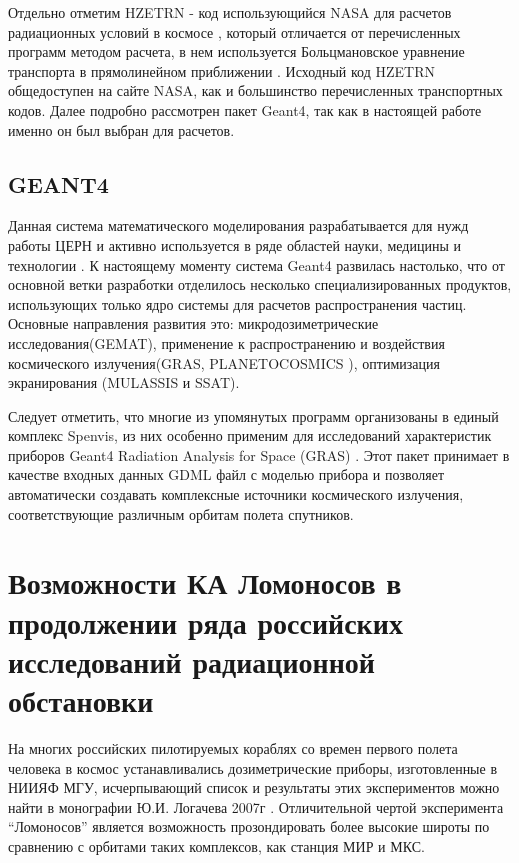 Отдельно отметим HZETRN - код использующийся NASA для расчетов радиационных условий в космосе \cite{Heinbockel2009}, который отличается от перечисленных программ методом расчета, в нем используется Больцмановское уравнение транспорта в прямолинейном приближении \cite{Wilson1995}. Исходный код HZETRN общедоступен на сайте NASA, как и большинство перечисленных транспортных кодов. Далее подробно рассмотрен  пакет Geant4, так как в настоящей работе именно он был выбран для расчетов. 


\subsection{GEANT4}

Данная система математического моделирования разрабатывается для нужд работы 
ЦЕРН и активно используется в ряде областей науки, медицины и технологии 
\cite{Agostinelli2003}.
К настоящему моменту система Geant4 развилась настолько, что от основной ветки 
разработки отделилось несколько специализированных продуктов, использующих 
только ядро системы для расчетов распространения частиц. Основные направления 
развития это: микродозиметрические исследования(GEMAT), применение к 
распространению и 
воздействия космического излучения(GRAS, PLANETOCOSMICS ), оптимизация 
экранирования (MULASSIS \cite{Lei2002} и SSAT). 

Следует отметить, что многие из упомянутых программ организованы в единый комплекс Spenvis, из них особенно применим для исследований характеристик приборов  Geant4 Radiation Analysis for Space (GRAS) \cite{Santin2005}. Этот пакет принимает в качестве входных данных GDML файл с моделью прибора и позволяет автоматически создавать комплексные источники космического излучения, соответствующие различным орбитам полета спутников.

\section{Возможности КА Ломоносов в продолжении ряда российских исследований радиационной обстановки}

На многих российских пилотируемых кораблях со времен первого полета человека в космос устанавливались дозиметрические приборы, изготовленные в НИИЯФ МГУ, исчерпывающий список и результаты этих экспериментов можно найти в монографии Ю.И. Логачева 2007г \cite{logachev2007}. Отличительной чертой эксперимента ``Ломоносов'' является возможность прозондировать более высокие широты по сравнению с орбитами таких комплексов, как станция МИР и МКС. 

